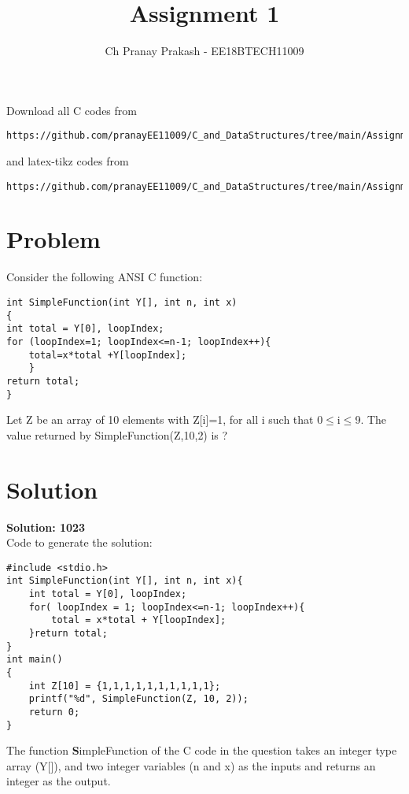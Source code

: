 \documentclass[journal,12pt,twocolumn]{IEEEtran}
\begin{document}
     \def\rightbox#1{\makebox[0in][r]{#1}}
     \def\centbox#1{\makebox[0in]{#1}}
     \def\topbox#1{\raisebox{-\baselineskip}[0in][0in]{#1}}
     \def\midbox#1{\raisebox{-0.5\baselineskip}[0in][0in]{#1}}
\vspace{3cm}
\title{Assignment 1}
\author{Ch Pranay Prakash - EE18BTECH11009}
\maketitle
\newpage
\bigskip
\renewcommand{\thefigure}{\theenumi}
\renewcommand{\thetable}{\theenumi}
Download all C codes from 
\begin{lstlisting}
https://github.com/pranayEE11009/C_and_DataStructures/tree/main/Assignment_1/codes
\end{lstlisting}
%
and latex-tikz codes from 
%
\begin{lstlisting}
https://github.com/pranayEE11009/C_and_DataStructures/tree/main/Assignment_1
\end{lstlisting}
\section{Problem}
Consider the following ANSI C function:
\begin{lstlisting}
int SimpleFunction(int Y[], int n, int x)
{
int total = Y[0], loopIndex;
for (loopIndex=1; loopIndex<=n-1; loopIndex++){
    total=x*total +Y[loopIndex];
    }
return total;
} 
\end{lstlisting}
Let Z be an array of 10 elements with Z[i]=1, for all i such that 0$\le$i$\le$9. The value returned by SimpleFunction(Z,10,2) is ?
\section{Solution}
{\textbf {Solution: 1023}}\\

Code to generate the solution:
\begin{lstlisting}
#include <stdio.h>
int SimpleFunction(int Y[], int n, int x){
    int total = Y[0], loopIndex;
    for( loopIndex = 1; loopIndex<=n-1; loopIndex++){
        total = x*total + Y[loopIndex];
    }return total;
}
int main()
{
    int Z[10] = {1,1,1,1,1,1,1,1,1,1};
    printf("%d", SimpleFunction(Z, 10, 2));
    return 0;
}
\end{lstlisting}

The function {\textbf SimpleFunction} of the C code in the question takes an integer type array (Y[]), and two integer variables (n and x) as the inputs and returns an integer as the output.\\
\end{document}
